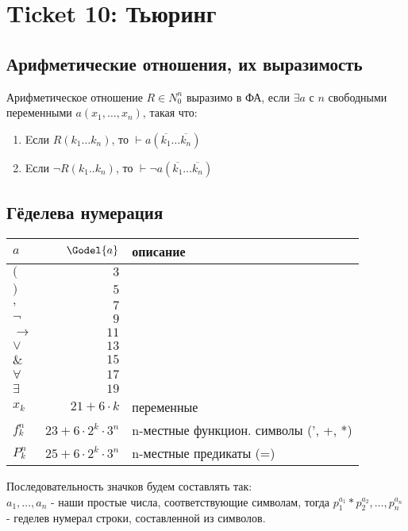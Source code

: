 \section{Ticket 10: Тьюринг}
\label{sec-12}
\subsection{Арифметические отношения, их выразимость}
\label{sec-12-1}
\item Арифметическое отношение $R \in N_0^n$ выразимо в ФА, если $\exists a$ с $n$ свободными переменными $a(x_1, \dotsc, x_n)$, такая что:
\begin{enumerate}
\item Eсли $R(k_1\dots k_n)$, то $\vdash a(\overline{k_1}\dots \overline{k_n})$
\item Eсли $\lnot R(k_1..k_n)$, то $\vdash \lnot a(\overline{k_1} \dots \overline{k_n})$
\end{enumerate}
\subsection{Гёделева нумерация}
\label{sec-12-2}
\begin{center}
\begin{tabular}{lrl}
$a$ & $\Godel{a}$ & описание\\
\hline
$($        & $3$ & \\
$)$        & $5$ & \\
$,$        & $7$ & \\
$\lnot$    & $9$ & \\
$\to$      & $11$ & \\
$\lor$     & $13$ & \\
$\&$       & $15$ & \\
$\forall$  & $17$ & \\
$\exists$  & $19$ & \\
$x_k$      & $21 + 6 \cdot k$ & переменные\\
$f^n_k$    & $23 + 6 \cdot 2^k \cdot 3^n$ & n-местные функцион. символы (', +, *)\\
$P^n_k$    & $25 + 6 \cdot 2^k \cdot 3^n$ & n-местные предикаты (=)\\
\hline
\end{tabular}
\end{center}
Последовательность значков будем составлять так:\\
$a_1, \dotsc, a_n$ - наши простые числа, соответствующие символам, тогда $p_1^{a_1} * p_2^{a_2}, \dotsc, p_n^{a_n}$ - геделев нумерал строки, составленной из символов.

